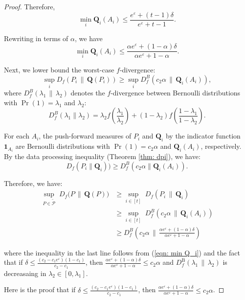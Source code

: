 \documentclass[accepted]{article}
\theoremstyle{plain} %
\theoremstyle{definition}
\theoremstyle{remark}
\newcommand{\eps}{\varepsilon}
\newcommand{\bQ}{\mathbf{Q}}
\begin{document}
\begin{proof}
Therefore,
\[
\min_i \bQ_i(A_i) \leq \frac{e^\varepsilon + (t-1)\delta}{e^\varepsilon + t-1}.
\]

Rewriting in terms of $\alpha$, we have
\begin{equation}\label{eqn: min Q_i}
\min_i \bQ_i(A_i) \leq \frac{\alpha e^\varepsilon + (1-\alpha)\delta}{\alpha e^\varepsilon + 1-\alpha}.    
\end{equation}



\medskip

Next, we lower bound the worst-case $f$-divergence:
\[
\sup_i D_f(P_i \,\|\, \bQ(P_i))
\geq \sup_i D_f^B\left(c_2 \alpha \,\|\, \bQ_i(A_i)\right),
\]
where $D_f^B(\lambda_1 \,\|\, \lambda_2)$ denotes the $f$-divergence between Bernoulli distributions with $\Pr(1) = \lambda_1$ and $\lambda_2$:
\[
D^B_f(\lambda_1 \parallel \lambda_2) = \lambda_2 f \left( \frac{\lambda_1}{\lambda_2} \right) + (1 - \lambda_2) f \left( \frac{1 - \lambda_1}{1 - \lambda_2} \right).
\]

For each $A_i$, the push-forward measures of $P_i$ and $\bQ_i$ by the indicator function $\mathbf{1}_{A_i}$ are Bernoulli distributions with $\Pr(1) = c_2 \alpha$ and $\bQ_i(A_i)$, respectively. By the data processing inequality (Theorem \ref{thm: dpi}), we have:
\[
D_f ( P_i\| \bQ_i) ) \geq D_f^B \left( c_2 \alpha \| \bQ_i(A_i) \right).
\]

Therefore, we have:
\begin{align*}
    \sup_{P \in \tilde{\mathcal{P}}} 
        \;D_f\big(P \, \| \, \bQ(P)\big) & \geq \sup_{i \in [t]} 
        \; D_f ( P_i \, \| \, \bQ_i) \\ & \geq  \sup_{i \in [t]} 
        \; D_f^B \left( c_2 \alpha \, \| \, \bQ_i(A_i) \right) \\ & \geq 
        D_f^B \left( c_2 \alpha \, \| \, \frac{\alpha e^\varepsilon + (1-\alpha)\delta}{\alpha e^\varepsilon + 1-\alpha} \right) 
\end{align*}

where the inequality in the last line follows from (\ref{eqn: min Q_i}) and the fact that if $\delta \leq \frac{(c_2-c_1e^\eps)(1-c_1)}{c_2-c_1}$, then $ \frac{\alpha e^\varepsilon + (1-\alpha)\delta}{\alpha e^\varepsilon + 1-\alpha}  \leq c_2 \alpha$ and $D_f^{\mathrm{B}}(\lambda_1 \,\|\, \lambda_2)$ is decreasaing in $\lambda_2 \in [0 , \lambda_1]$.

Here is the proof that if $\delta \leq \frac{(c_2-c_1e^\eps)(1-c_1)}{c_2-c_1}$, then $ \frac{\alpha e^\varepsilon + (1-\alpha)\delta}{\alpha e^\varepsilon + 1-\alpha}  \leq c_2 \alpha$.


\end{proof}
\end{document}
